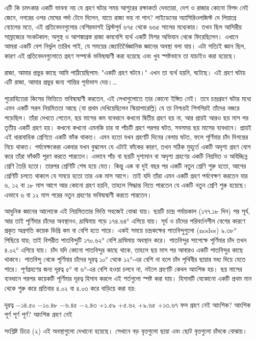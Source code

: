 এটি কি চমৎকার একটি ভাবনা নয় যে গ্রহণ ঘটার সময় আশুরের রক্ষাকর্তা দেবতারা, দেশ ও রাজার কোনো বিপদ নেই জেনে, নগরের ওপর মেঘের পর্দা টেনে দিলেন, যাতে রাজা ভয় না পান? লাইডেনের অ্যাসিরিওলজিস্ট দে লিয়াগ্রে ব্যোলের মতে, এই প্রতিবেদনগুলোর বেশিরভাগই খ্রিস্টপূর্ব ৬৭৫ থেকে ৬৬৫ সালের মধ্যেকার। তখন ছিল আসিরীয় সাম্রাজ্যের সংকটকাল; অসুস্থ ও আশঙ্কাগ্রস্ত রাজা কমবেশি ব্যর্থ একটি মিশর অভিযান থেকে ফিরেছিলেন। এখানে আমরা একটি বেশ নির্ভুল তারিখ পাই, যে সময়ের জ্যোতির্বৈজ্ঞানিক জ্ঞানের অবস্থা বলা যায়। এটা সত্যিই জ্ঞান ছিল, কারণ এই প্রতিবেদনগুলোতে গ্রহণ সম্পর্কে ভবিষ্যদ্বাণী করা হয়েছে এবং খুব স্পষ্টভাবে তা যাচাইও করা হয়েছে।

রাজা, আমার প্রভুর কাছে আমি পাঠিয়েছিলাম: "একটি গ্রহণ ঘটবে।" এখন তা ব্যর্থ হয়নি, ঘটেছে। এই গ্রহণ ঘটায় এটি রাজা, আমার প্রভুর জন্য শান্তির পূর্বাভাস দেয়।…

পুরোহিতেরা কিসের ভিত্তিতে ভবিষ্যদ্বাণী করতেন, এই লেখাগুলোতে তার কোনো ইঙ্গিত নেই। তবে চন্দ্রগ্রহণ ঘটার মধ্যে এমন একটি সরল নিয়মিততা আছে (যা প্রথম দেখিয়েছিলেন স্কিয়াপারেল্লি) যে তা নিশ্চয়ই শিগগিরই তাঁদের নজরে পড়েছিল। তাঁরা দেখতে পেতেন, ছয় মাসের কম ব্যবধানে কখনো দ্বিতীয় গ্রহণ হয় না, আর প্রায়ই আরও ছয় মাস পর তৃতীয় একটি গ্রহণ হয়। কখনো কখনো এমনকি চার বা পাঁচটি গ্রহণ পরপর ঘটত, সবসময় ছয় মাসের ব্যবধানে। প্রায়ই এই ধারাবাহিক শ্রেণিতে একটি ফাঁক থাকত। এমন হতো যখন গ্রহণটি দিনের বেলায় ঘটত, ফলে পূর্ণিমার চাঁদ দিগন্তের নিচে থাকত। পর্যবেক্ষকেরা একবার যখন বুঝলেন যে এটাই ফাঁকের কারণ, তখন সঠিক মুহূর্তে একটি অদৃশ্য গ্রহণ যোগ করে তাঁরা ফাঁকটি পূরণ করতে পারতেন। এভাবে পাঁচ বা ছয়টি দৃশ্যমান বা অদৃশ্য গ্রহণের একটি নিয়মিত ও অবিচ্ছিন্ন শ্রেণি তৈরি হতো। তারপর শ্রেণিটি শেষ হয়ে যেত। কিন্তু এক বা দুই বছর পর একটি নতুন শ্রেণি শুরু হতো, আগের শ্রেণিটি চলতে থাকলে যে সময়ে হতো তার এক মাস আগে। তাই যদি তাঁরা এমন একটি গ্রহণ পর্যবেক্ষণ করতেন যার ৬, ১২ বা ১৮ মাস আগে আর কোনো গ্রহণ হয়নি, তাহলে সিদ্ধান্ত নিতে পারতেন যে একটি নতুন শ্রেণি শুরু হয়েছে। এভাবে ৬ বা ১২ মাস পরের নতুন গ্রহণের ভবিষ্যদ্বাণী করতে পারতেন।

আধুনিক জ্ঞানের আলোকে এই নিয়মিততার ভিত্তি সহজেই বোঝা যায়। ছয়টি চান্দ্র পর্যায়কাল (১৭৭.১৮ দিন) পর সূর্য, আর তাই পূর্ণিমার চাঁদের অবস্থানও, দ্রাঘিমায় গড়ে ১৭৪.৬৪° এগিয়ে যায়। সূর্য ও চাঁদের পরিবর্তনশীল বেগের কারণে প্রকৃত অগ্রগতি কয়েক ডিগ্রি কম বা বেশি হতে পারে। একই সময়ে চন্দ্রকক্ষের পাতবিন্দুগুলো (nodes) ৯.৩৮° পিছিয়ে যায়; তাই বিপরীত পাতবিন্দুটি ১৭০.৬২° বেশি দ্রাঘিমায় অবস্থান করে। পাতবিন্দুর সাপেক্ষে পূর্ণিমার চাঁদ তখন ৪.০২° এগিয়ে যায়। চাঁদ যদি কোনো পাতবিন্দুর কাছে থাকে, তাহলে ছয় মাস পর আবারও একটি পাতবিন্দুর কাছে থাকবে। পাতবিন্দু থেকে পূর্ণিমার চাঁদের দূরত্ব ১০° থেকে ১২°-এর বেশি না হলে চাঁদ পৃথিবীর ছায়ার মধ্য দিয়ে যেতে পারে। পূর্ণগ্রহণের জন্য দূরত্ব ৫° বা ৬°-এর বেশি হওয়া চলবে না, নইলে গ্রহণটি কেবল আংশিক হয়। ছয় মাসের ব্যবধানে পরপর কয়েকটি পূর্ণিমার দূরত্ব হিসাব করলে এই শর্তগুলো স্পষ্ট করা যায়। হিসাবটি যেকোনো একটি প্রথম মান থেকে শুরু করে প্রতিবার ৪.০২ বা ৪.০৩ করে বাড়িয়ে করা হয়:

দূরত্ব	−১৪.৫০	−১০.৪৮	−৬.৪৫	−২.৪৩	+১.৫৯	+৫.৬২	+৯.৬৫	+১৩.৬৭
ফল	গ্রহণ নেই	আংশিক?	আংশিক	পূর্ণ	পূর্ণ	পূর্ণ?	আংশিক	গ্রহণ নেই

সংশ্লিষ্ট চিত্রে (২) এই অবস্থাগুলো দেখানো হয়েছে। সেখানে বড় বৃত্তগুলো ছায়া এবং ছোট বৃত্তগুলো চাঁদকে বোঝায়।